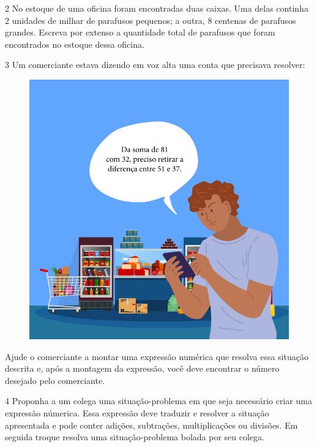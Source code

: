 

\num{2} No estoque de uma oficina foram encontradas duas caixas.
Uma delas continha 2 unidades de milhar de parafusos pequenos; a outra, 8
centenas de parafusos grandes. Escreva por extenso a quantidade total de
parafusos que foram encontrados no estoque dessa oficina.



\num{3} Um comerciante estava dizendo em voz alta uma conta que precisava
resolver:

\begin{figure}[htpb!]
\includegraphics[width=\textwidth]{../ilustracoes/MAT5/SAEB_5ANO_MAT_figura91.png}
\end{figure}

Ajude o comerciante a montar uma expressão numérica que resolva
essa situação descrita e, após a montagem da expressão, você deve
encontrar o número desejado pelo comerciante.



\num{4} Proponha a um colega uma situação-problema em que seja necessário
criar uma expressão númerica. Essa expressão deve traduzir e resolver a
situação apresentada e pode conter adições, subtrações, multiplicações 
ou divisões. Em seguida troque resolva uma situação-problema bolada por 
seu colega.


